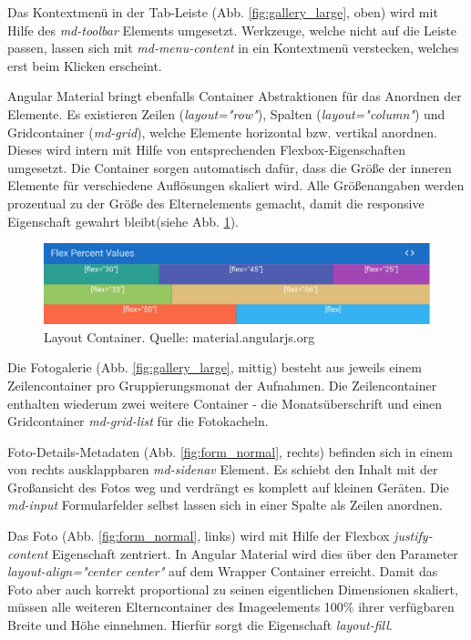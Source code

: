 Das Kontextmenü in der Tab-Leiste (Abb. \ref{fig:gallery_large}, oben) wird mit Hilfe des \textit{md-toolbar} Elements umgesetzt. Werkzeuge, welche nicht auf die Leiste passen, lassen sich mit \textit{md-menu-content} in ein Kontextmenü verstecken, welches erst beim Klicken erscheint.

Angular Material bringt ebenfalls Container Abstraktionen für das Anordnen der Elemente. Es existieren Zeilen (\textit{layout="row"}), Spalten (\textit{layout="column"}) und Gridcontainer (\textit{md-grid}), welche Elemente horizontal bzw. vertikal anordnen. Dieses wird intern  mit Hilfe von entsprechenden Flexbox-Eigenschaften umgesetzt. Die Container sorgen automatisch dafür, dass die Größe der inneren Elemente für verschiedene Auflösungen skaliert wird. Alle Größenangaben werden prozentual zu der Größe des Elternelements gemacht, damit die responsive Eigenschaft gewahrt bleibt(siehe Abb. \ref{fig:layout_container}).

\begin{figure}[htp]     %
\centering
\includegraphics[width=1.0\textwidth]{images/layout_container}
\caption{Layout Container. Quelle: material.angularjs.org}\label{fig:layout_container}
\end{figure}

Die Fotogalerie (Abb. \ref{fig:gallery_large}, mittig) besteht aus jeweils einem Zeilencontainer pro Gruppierungsmonat der Aufnahmen. Die Zeilencontainer enthalten wiederum zwei weitere Container - die Monatsüberschrift und einen Gridcontainer \textit{md-grid-list} für die Fotokacheln.

Foto-Details-Metadaten (Abb. \ref{fig:form_normal}, rechts) befinden sich in einem von rechts ausklappbaren \textit{md-sidenav} Element. Es schiebt den Inhalt mit der Großansicht des Fotos weg und verdrängt es komplett auf kleinen Geräten. Die \textit{md-input} Formularfelder selbst lassen sich in einer Spalte als Zeilen anordnen.

Das Foto (Abb. \ref{fig:form_normal}, links) wird mit Hilfe der Flexbox \textit{justify-content} Eigenschaft zentriert. In Angular Material wird dies über den Parameter \textit{layout-align="center center"} auf dem Wrapper Container erreicht. Damit das Foto aber auch korrekt proportional zu seinen eigentlichen Dimensionen skaliert, müssen alle weiteren Elterncontainer des Imageelements 100\% ihrer verfügbaren Breite und Höhe einnehmen. Hierfür sorgt die Eigenschaft \textit{layout-fill}.

